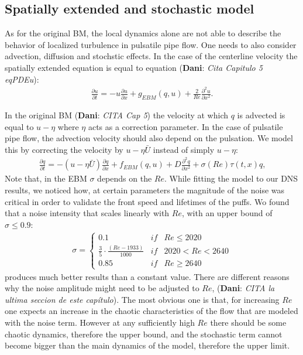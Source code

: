 \documentclass{article}
\DeclareRobustCommand{\dm}[1]{{\color{blue}(\textbf{Dani}: \textit{#1}\xspace)}}
\begin{document}
\subsection{Spatially extended and stochastic model}
As for the original BM, the local dynamics alone are not able to describe the behavior of localized turbulence in pulsatile pipe flow. One needs to also consider advection, diffusion and stochstic effects. In the case of the centerline velocity the spatially extended equation is equal to equation \dm{Cita Capitulo 5 eqPDEu}:
\begin{align}
\frac{\partial u}{\partial t}=-u\frac{\partial u}{\partial x} + g_{EBM}\left(q,u \right) + \frac{2}{Re}\frac{\partial^{2} u}{\partial x^{2}} \text{.}
\label{eq:PDE_u_EBM}
\end{align}

In the original BM \dm{CITA Cap 5} the velocity at which $q$ is advected is equal to $u-\eta$ where $\eta$ acts as a correction parameter. In the case of pulsatile pipe flow, the advection velocity should also depend on the pulsation. We model this by correcting the velocity by $u-\eta \bar{U}$ instead of simply $u-\eta$:
\begin{align}
\frac{\partial q}{\partial t}=-\left(u-\eta \bar{U} \right)\frac{\partial q}{\partial x} + f_{EBM}\left(q,u \right) + D\frac{\partial^{2} q}{\partial x^{2}} + \sigma \left(Re \right) \tau \left(t,x\right) q \text{,}
\label{eq:SPDE_q_EBM}
\end{align}
Note that, in the EBM $\sigma$ depends on the $Re$. While fitting the model to our DNS results, we noticed how, at certain parameters the magnitude of the noise was critical in order to validate the front speed and lifetimes of the puffs. Wo found that a noise intensity that scales linearly with $Re$, with an upper bound of $\sigma \leq 0.9$:
\begin{align}
\sigma= \left\{\begin{matrix}
0.1 & if & Re \leq 2020\\ 
\frac{3}{5}\cdot \frac{\left(Re-1933 \right )}{1000} & if & 2020<Re<2640\\ 
 0.85 & if & Re\geq 2640
\end{matrix}\right.
\label{eq:sigma_EBM}
\end{align}
produces much better results than a constant value. There are different reasons why the noise amplitude might need to be adjusted to  $Re$, \dm{CITA la ultima seccion de este capítulo}. The most obvious one is that, for increasing $Re$ one expects an increase in the chaotic characteristics of the flow that are modeled with the noise term. However at any sufficiently high $Re$ there should be some chaotic dynamics, therefore the upper bound, and the stochastic term cannot become bigger than the main dynamics of the model, therefore the upper limit. 
\end{document}

